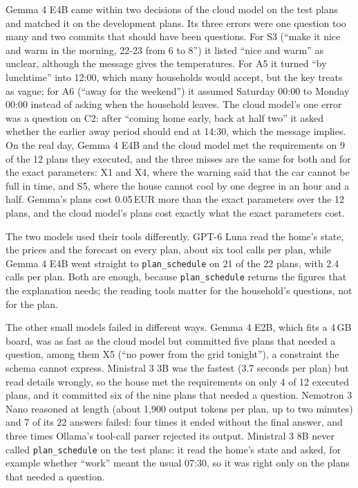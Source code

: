 \documentclass[12pt,a4paper]{report}
\begin{document}
Gemma 4 E4B came within two decisions of the cloud model on the test
plans and matched it on the development plans. Its three errors were
one question too many and two commits that should have been questions.
For S3 (``make it nice and warm in the morning, 22-23 from 6 to 8'') it
listed ``nice and warm'' as unclear, although the message gives the
temperatures. For A5 it turned ``by lunchtime'' into 12:00, which many
households would accept, but the key treats as vague; for A6 (``away for
the weekend'') it assumed Saturday 00:00 to Monday 00:00 instead of
asking when the household leaves. The cloud model's one error was a
question on C2: after ``coming home early, back at half two'' it asked
whether the earlier away period should end at 14:30, which the message
implies. On the real day, Gemma 4 E4B and the cloud model met the
requirements on 9 of the 12 plans they executed, and the three misses
are the same for both and for the exact parameters: X1 and X4, where
the warning said that the car cannot be full in time, and S5, where the
house cannot cool by one degree in an hour and a half. Gemma's plans
cost 0.05\,EUR more than the exact parameters over the 12 plans, and
the cloud model's plans cost exactly what the exact parameters cost.

The two models used their tools differently. GPT-6 Luna read the home's
state, the prices and the forecast on every plan, about six tool calls
per plan, while Gemma 4 E4B went straight to \texttt{plan\_schedule} on
21 of the 22 plans, with 2.4 calls per plan. Both are enough, because
\texttt{plan\_schedule} returns the figures that the explanation needs;
the reading tools matter for the household's questions, not for the
plan.

The other small models failed in different ways. Gemma 4 E2B, which fits
a 4\,GB board, was as fast as the cloud model but committed five plans
that needed a question, among them X5 (``no power from the grid
tonight''), a constraint the schema cannot express. Ministral 3 3B was
the fastest (3.7 seconds per plan) but read details wrongly, so the
house met the requirements on only 4 of 12 executed plans, and it
committed six of the nine plans that needed a question. Nemotron 3 Nano
reasoned at length (about 1,900 output tokens per plan, up to two
minutes) and 7 of its 22 answers failed: four times it ended without
the final answer, and three times Ollama's tool-call parser rejected its
output. Ministral 3 8B never called
\texttt{plan\_schedule} on the test plans: it read the home's state and
asked, for example whether ``work'' meant the usual 07:30, so it was
right only on the plans that needed a question.
\end{document}
